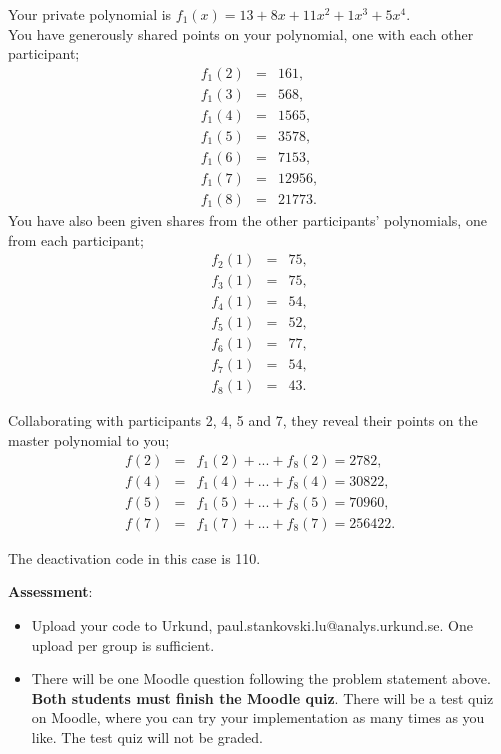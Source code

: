 \documentclass{article}
\begin{document}
\begin{description}
{    Your private polynomial is $f_{1}(x) = 13 +  8x + 11x^2 +  1x^3 +  5x^4$.\\
    You have generously shared points on your polynomial, one with each other participant;
    \begin{eqnarray*}
    f_{1}(2) &=& 161,\\
    f_{1}(3) &=& 568,\\
    f_{1}(4) &=& 1565,\\
    f_{1}(5) &=& 3578,\\
    f_{1}(6) &=& 7153,\\
    f_{1}(7) &=& 12956,\\
    f_{1}(8) &=& 21773.
    \end{eqnarray*}
    You have also been given shares from the other participants' polynomials, one from each participant;
    \begin{eqnarray*}
    f_{2}(1) &=& 75,\\
    f_{3}(1) &=& 75,\\
    f_{4}(1) &=& 54,\\
    f_{5}(1) &=& 52,\\
    f_{6}(1) &=& 77,\\
    f_{7}(1) &=& 54,\\
    f_{8}(1) &=& 43.
    \end{eqnarray*}

Collaborating with participants 2, 4, 5 and 7, they reveal their points on the master polynomial to you;
    \begin{eqnarray*}
    f(2) &=& f_{1}(2) + ... + f_{8}(2) = 2782,\\
    f(4) &=& f_{1}(4) + ... + f_{8}(4) = 30822,\\
    f(5) &=& f_{1}(5) + ... + f_{8}(5) = 70960,\\
    f(7) &=& f_{1}(7) + ... + f_{8}(7) = 256422.
    \end{eqnarray*}

    The deactivation code in this case is 110.

    \textbf{Assessment}:
	\begin{itemize}
		\item Upload your code to Urkund, paul.stankovski.lu@analys.urkund.se.
        One upload per group is sufficient.
        
		\item There will be one Moodle question following the problem statement above. 
        \textbf{Both students must finish the Moodle quiz}.
        There will be a test quiz on Moodle, where you can try your implementation as many times as you like. 
        The test quiz will not be graded.
	\end{itemize}}


\end{description}
\end{document}
